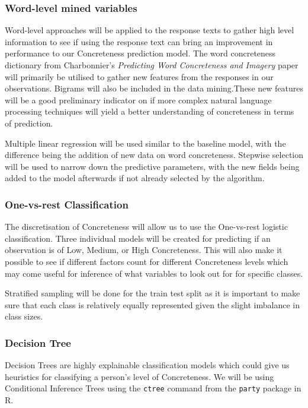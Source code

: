\documentclass[12pt, a4paper]{article}
\begin{document}
\subsubsection{Word-level mined variables}
Word-level approaches will be applied to the response texts to gather high level information to see if using the response text can bring an improvement in performance to our Concreteness prediction model. The word concreteness dictionary from Charbonnier's \textit{Predicting Word Concreteness and Imagery} paper \cite{charbonnier-wartena-2019-predicting} will primarily be utilised to gather new features from the responses in our observations. Bigrams will also be included in the data mining.These new features will be a good preliminary indicator on if more complex natural language processing techniques will yield a better understanding of concreteness in terms of prediction.

Multiple linear regression will be used similar to the baseline model, with the difference being the addition of new data on word concreteness. Stepwise selection will be used to narrow down the predictive parameters, with the new fields being added to the model afterwards if not already selected by the algorithm. 

\subsubsection{One-vs-rest Classification}
The discretisation of Concreteness will allow us to use the One-vs-rest logistic classification. Three individual models will be created for predicting if an observation is of Low, Medium, or High Concreteness. This will also make it possible to see if different factors count for different Concreteness levels which may come useful for inference of what variables to look out for for specific classes. 

Stratified sampling will be done for the train test split as it is important to make sure that each class is relatively equally represented given the slight imbalance in class sizes.

\subsubsection{Decision Tree}
Decision Trees are highly explainable classification models which could give us heuristics for classifying a person's level of Concreteness. We will be using Conditional Inference Trees \cite{ctree} using the \lstinline{ctree} command  from the \lstinline{party} package in R.
\end{document}

